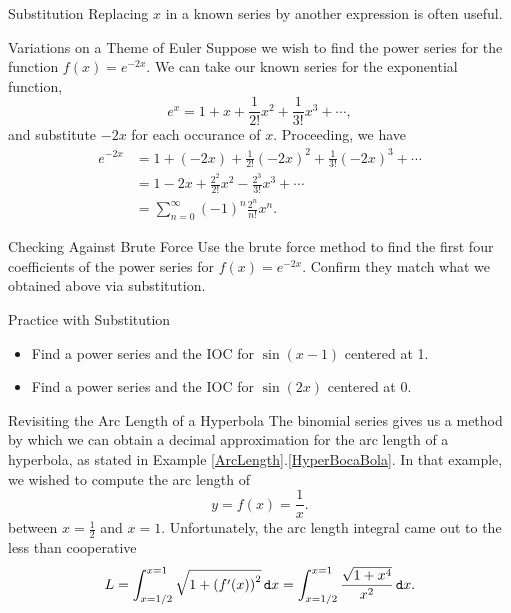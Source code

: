 \begin{subsection}{Substitution}\label{PowerSeriesSubstitution}  Replacing $x$ in a known series by another expression is often useful.

\begin{example}{Variations on a Theme of Euler}
Suppose we wish to find the power series for the function $f(x)=e^{-2x}$.  We can take our known series for the exponential function, $$e^x=1+x+\frac{1}{2!}x^2+\frac{1}{3!}x^3+\cdots, $$ and substitute $-2x$ for each occurance of $x$.  Proceeding, we have 
\begin{align*}
e^{-2x}&=1+\left(-2x\right)+\frac{1}{2!}\left(-2x\right)^2+\frac{1}{3!}\left(-2x\right)^3+\cdots\\
&=1-2x+\frac{2^2}{2!}x^2-\frac{2^3}{3!}x^3+\cdots\\
&=\sum_{n=0}^\infty\left(-1\right)^n\frac{2^n}{n!}x^n.
\end{align*}\end{example}
\begin{exercise}{Checking Against Brute Force \Coffeecup}
Use the brute force method to find the first four coefficients of the power series for $f(x)=e^{-2x}$.  Confirm they match what we obtained above via substitution. \vspace*{2in}
\end{exercise}
\begin{exercise}{Practice with Substitution \Coffeecup \Coffeecup \Coffeecup}
\begin{itemize}
\item Find a power series and the IOC for $\sin(x-1)$ centered at 1.
\vspace*{1in}
\item Find a power series and the IOC for $\sin(2x)$ centered at 0.
\vspace*{1in}
\end{itemize}
\end{exercise}

\begin{example}{Revisiting the Arc Length of a Hyperbola}
The binomial series gives us a method by which we can obtain a decimal approximation for the arc length of a hyperbola, as stated in Example \ref{ArcLength}.\ref{HyperBocaBola}.  In that example, we wished to compute 
the arc length of $$y=f(x)=\frac{1}{x}. $$ between $x=\frac{1}{2}$ and $x=1$.  Unfortunately, the arc length integral came out to the less than cooperative  $$L= \int_{x=1/2}^{x=1} \sqrt{1+\left( f'(x)\right)^2 } \mathop{}\!\mathtt{d} x= \int_{x=1/2}^{x=1} \frac{\sqrt{1+x^4}}{x^2} \mathop{}\!\mathtt{d} x. $$


\end{example}
\end{subsection}
